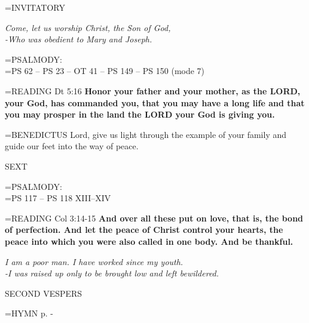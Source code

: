 \hangindent=\parindent \small{INVITATORY}
\begin{center}
\textit{Come, let us worship Christ, the Son of God,\\}
\textit{-Who was obedient to Mary and Joseph.\\}
\end{center}

\hangindent=\parindent \small{PSALMODY:}\\
\hangindent=\parindent  PS 62 -- PS 23 -- OT 41 -- PS 149 -- PS 150 (mode 7)\vspace{0.5em}

\hangindent=\parindent \small{\uppercase{READING}}    Dt 5:16 \textbf{   Honor your father and your mother, as the LORD, your God, has commanded you, that you may have a long life and that you may prosper in the land the LORD your God is giving you. \\}

\hangindent=\parindent \small{BENEDICTUS 	Lord, give us light through the example of your family and guide our feet into the way of peace.\\}

\begin{flushleft}\normalsize SEXT\\\end{flushleft}

\hangindent=\parindent \small{PSALMODY:}\\
\hangindent=\parindent  PS 117 -- PS 118 XIII--XIV\vspace{0.5em}

\hangindent=\parindent \small{\uppercase{READING}}    Col 3:14-15 \textbf{   And over all these put on love, that is, the bond of perfection. And let the peace of Christ control your hearts, the peace into which you were also called in one body. And be thankful.\\}

\begin{center}
\textit{I am a poor man. I have worked since my youth.\\
-I was raised up only to be brought low and left bewildered.}
\end{center}

\begin{flushleft}\normalsize SECOND VESPERS\\\end{flushleft}

\hangindent=\parindent \small{\uppercase{HYMN} p. \pageref{christmas:firstHymn}-\pageref{christmas:lastHymn}\\}

